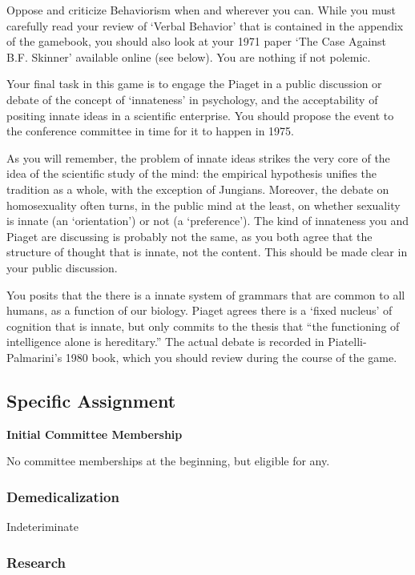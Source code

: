 \begin{refsection}
Oppose and criticize Behaviorism when and wherever you can. While you must carefully read your review of `Verbal Behavior' that is contained in the appendix of the gamebook, you should also look at your 1971 paper `The Case Against B.F. Skinner' available online (see below). You are nothing if not polemic.

Your final task in this game is to engage the Piaget in a public discussion or debate of the concept of `innateness' in psychology, and the acceptability of positing innate ideas in a scientific enterprise. You should propose the event to the conference committee in time for it to happen in 1975.

As you will remember, the problem of innate ideas strikes the very core of the idea of the scientific study of the mind: the empirical hypothesis unifies the tradition as a whole, with the exception of Jungians. Moreover, the debate on homosexuality often turns, in the public mind at the least, on whether sexuality is innate (an `orientation') or not (a `preference'). The kind of innateness you and Piaget are discussing is probably not the same, as you both agree that the structure of thought that is innate, not the content. This should be made clear in your public discussion.

You posits that the there is a innate system of grammars that are common to all humans, as a function of our biology. Piaget agrees there is a `fixed nucleus' of cognition that is innate, but only commits to the thesis that “the functioning of intelligence alone is hereditary.” The actual debate is recorded in Piatelli-Palmarini's 1980 book, which you should review during the course of the game.

\subsection{Specific Assignment}
\label{specificassignment}

\textbf{Initial Committee Membership}

No committee memberships at the beginning, but eligible for any.

\subsubsection{Demedicalization}
\label{demedicalization}

Indeteriminate

\subsubsection{Research}
\label{research}


\end{refsection}
